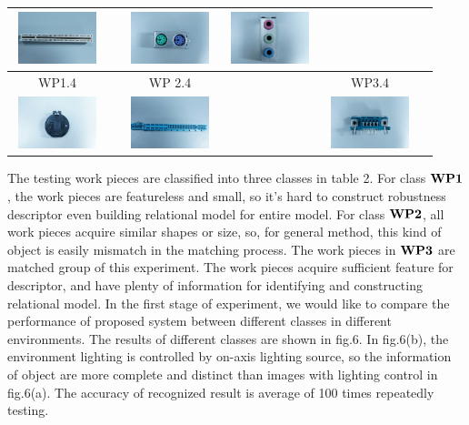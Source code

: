 \documentclass[journal]{IEEEtran}
\begin{document}
\begin{table}[!t]
\begin{center}
\begin{tabular}{|c|c||c|c||c|c|}
\includegraphics[width=1in,height=0.6in]{j_img/wp23.jpg} & 
 &
\includegraphics[width=1in,height=0.6in]{j_img/wp33.jpg} & 
\includegraphics[width=1in,height=0.6in]{j_img/wp37.jpg} 
\\
\hline
WP1.4 & & WP 2.4 & & WP3.4 &\\
\hline
\includegraphics[width=1in,height=0.6in]{j_img/wp14.jpg} & 
 & 
\includegraphics[width=1in,height=0.6in]{j_img/wp24.jpg} & 
 &
\includegraphics[width=1in,height=0.6in]{j_img/wp34.jpg} & 
\\ 
\hline
\end{tabular}
\end{center}
\end{table}

The testing work pieces are classified into three classes in table 2. For class $\bf{WP1}$, the work pieces are featureless and small, so it's hard to construct robustness descriptor even building relational model for entire model. For class $\bf{WP2}$, all work pieces acquire similar shapes or size, so, for general method, this kind of object is easily mismatch in the matching process. The work pieces in $\bf{WP3}$ are matched group of this experiment. The work pieces acquire sufficient feature for descriptor, and have plenty of information for identifying and constructing relational model. In the first stage of experiment, we would like to compare the performance of proposed system between different classes in different environments.  The results of different classes are shown in fig.6. In fig.6(b), the environment lighting is controlled by on-axis lighting source, so the information of object are more complete and distinct than images with lighting control in fig.6(a). The accuracy of recognized result is average of 100 times repeatedly testing.
\end{document}
